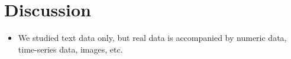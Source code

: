 \section{Discussion}
\begin{itemize}
\item We studied text data only, but real data is accompanied by numeric data, time-series data, images, etc.
\end{itemize}